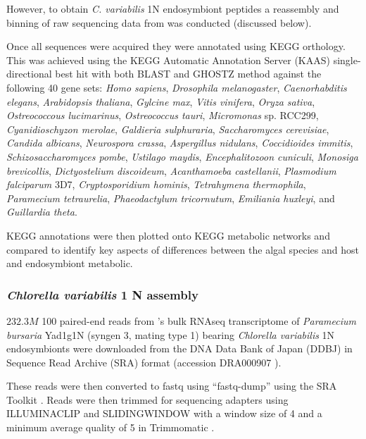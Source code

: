 However, to obtain \textit{C. variabilis} 1N endosymbiont peptides 
a reassembly and binning of raw sequencing data from \citep{Kodama2014}
was conducted (discussed below). 

Once all sequences were acquired they were annotated using KEGG
orthology.  This was achieved 
using the KEGG Automatic Annotation Server (KAAS) \citep{Moriya2007a}
single-directional best hit with both BLAST and GHOSTZ \citep{Suzuki2014,Suzuki2015} 
method against the following 40 gene sets: \textit{Homo sapiens}, 
\textit{Drosophila melanogaster}, \textit{Caenorhabditis elegans},
\textit{Arabidopsis thaliana}, \textit{Gylcine max},
\textit{Vitis vinifera}, \textit{Oryza sativa}, 
\textit{Ostreococcous lucimarinus}, \textit{Ostreococcus tauri},
\textit{Micromonas} sp. RCC299, \textit{Cyanidioschyzon merolae},
\textit{Galdieria sulphuraria}, \textit{Saccharomyces cerevisiae},
\textit{Candida albicans}, \textit{Neurospora crassa}, \textit{Aspergillus nidulans},
\textit{Coccidioides immitis}, \textit{Schizosaccharomyces pombe},
\textit{Ustilago maydis}, \textit{Encephalitozoon cuniculi},
\textit{Monosiga brevicollis}, \textit{Dictyostelium discoideum}, 
\textit{Acanthamoeba castellanii}, \textit{Plasmodium falciparum} 3D7, 
\textit{Cryptosporidium hominis}, \textit{Tetrahymena thermophila},
\textit{Paramecium tetraurelia}, \textit{Phaeodactylum tricornutum},
\textit{Emiliania huxleyi}, and \textit{Guillardia theta}.

KEGG annotations were then plotted onto KEGG metabolic networks and compared 
to identify key aspects of differences between the algal species and
host and endosymbiont metabolic.

\subsubsection{\textit{Chlorella variabilis} 1 N assembly}
\(232.3M\) \SI{100}{\bp} paired-end reads from \citep{Kodama2014}'s 
bulk RNAseq transcriptome of \textit{Paramecium bursaria} Yad1g1N (syngen
3, mating type 1) bearing \textit{Chlorella variabilis} 1N endosymbionts
were downloaded from the DNA Data Bank of Japan (DDBJ) \citep{Tateno2002,Kaminuma2011}
in Sequence Read Archive (SRA) format \citep{Leinonen2011,KodamaNRA2012b} (accession DRA000907 \citet{Kodama2014}).

These reads were then converted to fastq using ``fastq-dump'' using the SRA Toolkit
\citep{NationalCenterforBiotechnologyInformation2011}.  Reads were then trimmed
for sequencing adapters using ILLUMINACLIP and SLIDINGWINDOW with a window size
of 4 and a minimum average quality of 5 in Trimmomatic \citep{Bolger2014a}.

